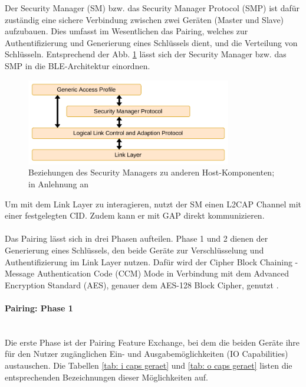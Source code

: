Der Security Manager (SM) bzw. das Security Manager Protocol (SMP) ist dafür zuständig eine sichere Verbindung zwischen zwei Geräten (Master und Slave) aufzubauen. Dies umfasst im Wesentlichen das Pairing, welches zur Authentifizierung und Generierung eines Schlüssels dient, und die Verteilung von Schlüsseln. Entsprechend der Abb. \ref{fig: smp in bt} lässt sich der Security Manager bzw. das SMP in die BLE-Architektur einordnen.

\begin{figure}[H]
    \centering
    \includegraphics[width=0.8\textwidth]{graphics/smp_in_bt.pdf}
    \caption[Beziehungen des Security Managers zu anderen Host-Komponenten]{Beziehungen des Security Managers zu anderen Host-Komponenten; in Anlehnung an \cite{BtSpec4.0_fig_1958}}
    \label{fig: smp in bt}
\end{figure}

Um mit dem Link Layer zu interagieren, nutzt der SM einen L2CAP Channel mit einer festgelegten CID. Zudem kann er mit GAP direkt kommunizieren.
\\\\
Das Pairing lässt sich in drei Phasen aufteilen. Phase 1 und 2 dienen der Generierung eines Schlüssels, den beide Geräte zur Verschlüsselung und Authentifizierung im Link Layer nutzen. Dafür wird der Cipher Block Chaining - Message Authentication Code (CCM) Mode in Verbindung mit dem Advanced Encryption Standard (AES), genauer dem AES-128 Block Cipher, genutzt \cite{BtSpec4.0_2285}.

\paragraph{Pairing: Phase 1} \mbox{} \vspace{0.2cm} \\
Die erste Phase ist der Pairing Feature Exchange, bei dem die beiden Geräte ihre für den Nutzer zugänglichen Ein- und Ausgabemöglichkeiten (IO Capabilities) austauschen. Die Tabellen \ref{tab: i caps geraet} und \ref{tab: o caps geraet} 
listen die entsprechenden Bezeichnungen dieser Möglichkeiten auf.
\\\\

